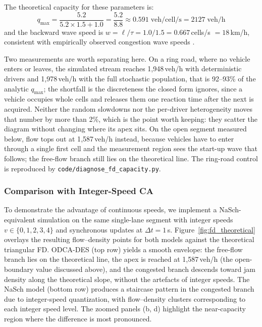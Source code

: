 \documentclass[review,authoryear]{elsarticle}
\begin{document}
The theoretical capacity for these parameters is:
\begin{equation}
    q_{\max} = \frac{5.2}{5.2 \times 1.5 + 1.0} = \frac{5.2}{8.8} \approx 0.591\;\text{veh/cell/s} = 2127\;\text{veh/h}
\end{equation}
and the backward wave speed is $w = \ell/\tau = 1.0/1.5 = 0.667$\,cells/s $= 18$\,km/h, consistent with empirically observed congestion wave speeds \citep{cassidy1998bivariate}.

Two measurements are worth separating here. On a ring road, where no vehicle enters or leaves, the simulated stream reaches 1{,}948\,veh/h with deterministic drivers and 1{,}978\,veh/h with the full stochastic population, that is 92--93\% of the analytic $q_{\max}$; the shortfall is the discreteness the closed form ignores, since a vehicle occupies whole cells and releases them one reaction time after the next is acquired. Neither the random slowdowns nor the per-driver heterogeneity moves that number by more than 2\%, which is the point worth keeping: they scatter the diagram without changing where its apex sits. On the open segment measured below, flow tops out at 1{,}587\,veh/h instead, because vehicles have to enter through a single first cell and the measurement region sees the start-up wave that follows; the free-flow branch still lies on the theoretical line. The ring-road control is reproduced by \texttt{code/diagnose\_fd\_capacity.py}.

\subsubsection{Comparison with Integer-Speed CA}

To demonstrate the advantage of continuous speeds, we implement a NaSch-equivalent simulation on the same single-lane segment with integer speeds $v \in \{0, 1, 2, 3, 4\}$ and synchronous updates at $\Delta t = 1$\,s. Figure~\ref{fig:fd_theoretical} overlays the resulting flow--density points for both models against the theoretical triangular FD. ODCA-DES (top row) yields a smooth envelope: the free-flow branch lies on the theoretical line, the apex is reached at 1{,}587\,veh/h (the open-boundary value discussed above), and the congested branch descends toward jam density along the theoretical slope, without the artefacts of integer speeds. The NaSch model (bottom row) produces a staircase pattern in the congested branch due to integer-speed quantization, with flow--density clusters corresponding to each integer speed level. The zoomed panels (b, d) highlight the near-capacity region where the difference is most pronounced.
\end{document}
